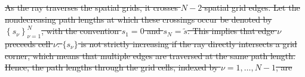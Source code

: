 \documentclass[ms,cpyr,lof,lot]{uathesis}
\providecommand{\DIFdel}[1]{{\protect\color{red}\sout{#1}}}                      %
\providecommand{\DIFdelbegin}{} %
\newcommand{\DIFscaledelfig}{0.5}
\newlength{\DIFdelgraphicswidth} %
\newlength{\DIFdelgraphicsheight} %
\newcommand{\DIFdelincludegraphics}[2][]{%
\sbox{\DIFdelgraphicsbox}{\DIFOincludegraphics[#1]{#2}}%
\settoboxwidth{\DIFdelgraphicswidth}{\DIFdelgraphicsbox} %
\settoboxtotalheight{\DIFdelgraphicsheight}{\DIFdelgraphicsbox} %
\scalebox{\DIFscaledelfig}{%
\parbox[b]{\DIFdelgraphicswidth}{\usebox{\DIFdelgraphicsbox}\\[-\baselineskip] \rule{\DIFdelgraphicswidth}{0em}}\llap{\resizebox{\DIFdelgraphicswidth}{\DIFdelgraphicsheight}{%
\setlength{\unitlength}{\DIFdelgraphicswidth}%
\begin{picture}(1,1)%
\thicklines\linethickness{2pt} %
{\color[rgb]{1,0,0}\put(0,0){\framebox(1,1){}}}%
{\color[rgb]{1,0,0}\put(0,0){\line( 1,1){1}}}%
{\color[rgb]{1,0,0}\put(0,1){\line(1,-1){1}}}%
\end{picture}%
}\hspace*{3pt}}} %
} %
\DeclareRobustCommand{\DIFdelbegin}{\DIFOdelbegin \let\includegraphics\DIFdelincludegraphics} %
\begin{document}
%
%
%
%
%

\DIFdelbegin \DIFdel{As the ray traverses the spatial grids, it crosses $N-2$ spatial grid edges.
Let the nondecreasing path lengths at which these crossings occur be denoted by
$\left\{s_\nu\right\}_{\nu=1}^{N}$, with the convention $s_1=0$ and $s_{N}=\tilde{s}$.
This implies that edge $\nu$ preceeds cell $\nu$.
$\{s_\nu\}$ is not strictly increasing if the ray directly intersects a grid corner,
which means that multiple edges are traversed at the same path length.
Hence, the path lengths through the grid cells, indexed by $\nu=1,\ldots,N-1$, are
}%
\end{document}
